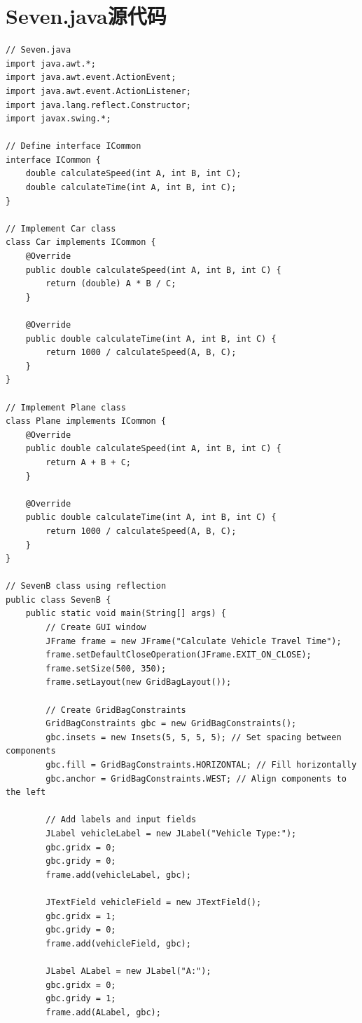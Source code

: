 \documentclass[12pt,a4paper]{article}
\begin{document}
\section*{Seven.java源代码}\label{sec:seven}
\begin{lstlisting}
// Seven.java
import java.awt.*;
import java.awt.event.ActionEvent;
import java.awt.event.ActionListener;
import java.lang.reflect.Constructor;
import javax.swing.*;

// Define interface ICommon
interface ICommon {
    double calculateSpeed(int A, int B, int C);
    double calculateTime(int A, int B, int C);
}

// Implement Car class
class Car implements ICommon {
    @Override
    public double calculateSpeed(int A, int B, int C) {
        return (double) A * B / C;
    }

    @Override
    public double calculateTime(int A, int B, int C) {
        return 1000 / calculateSpeed(A, B, C);
    }
}

// Implement Plane class
class Plane implements ICommon {
    @Override
    public double calculateSpeed(int A, int B, int C) {
        return A + B + C;
    }

    @Override
    public double calculateTime(int A, int B, int C) {
        return 1000 / calculateSpeed(A, B, C);
    }
}

// SevenB class using reflection
public class SevenB {
    public static void main(String[] args) {
        // Create GUI window
        JFrame frame = new JFrame("Calculate Vehicle Travel Time");
        frame.setDefaultCloseOperation(JFrame.EXIT_ON_CLOSE);
        frame.setSize(500, 350);
        frame.setLayout(new GridBagLayout());

        // Create GridBagConstraints
        GridBagConstraints gbc = new GridBagConstraints();
        gbc.insets = new Insets(5, 5, 5, 5); // Set spacing between components
        gbc.fill = GridBagConstraints.HORIZONTAL; // Fill horizontally
        gbc.anchor = GridBagConstraints.WEST; // Align components to the left

        // Add labels and input fields
        JLabel vehicleLabel = new JLabel("Vehicle Type:");
        gbc.gridx = 0;
        gbc.gridy = 0;
        frame.add(vehicleLabel, gbc);

        JTextField vehicleField = new JTextField();
        gbc.gridx = 1;
        gbc.gridy = 0;
        frame.add(vehicleField, gbc);

        JLabel ALabel = new JLabel("A:");
        gbc.gridx = 0;
        gbc.gridy = 1;
        frame.add(ALabel, gbc);


\end{lstlisting}
\end{document}

